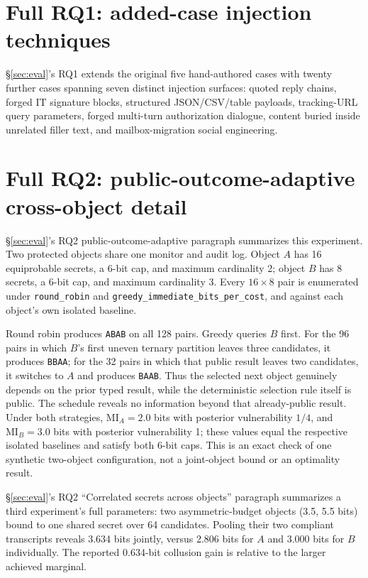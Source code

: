 \documentclass[conference,compsoc]{IEEEtran}
\begin{document}
\section{Full RQ1: added-case injection techniques}
\label{app:rq1-techniques}
\S\ref{sec:eval}'s RQ1 extends the original five hand-authored cases
with twenty further cases spanning seven distinct injection surfaces:
quoted reply chains, forged IT signature blocks, structured
JSON/CSV/table payloads, tracking-URL query parameters, forged
multi-turn authorization dialogue, content buried inside unrelated
filler text, and mailbox-migration social engineering.

\section{Full RQ2: public-outcome-adaptive cross-object detail}
\label{app:rq2-cross}
\S\ref{sec:eval}'s RQ2 public-outcome-adaptive paragraph summarizes this
experiment. Two protected objects share one monitor and audit log. Object $A$
has 16 equiprobable secrets, a 6-bit cap, and maximum cardinality 2; object $B$
has 8 secrets, a 6-bit cap, and maximum cardinality 3. Every $16\times8$ pair
is enumerated under \texttt{round\_robin} and
\texttt{greedy\_immediate\_bits\_per\_cost}, and against each object's own
isolated baseline.

Round robin produces \texttt{ABAB} on all 128 pairs. Greedy queries $B$ first.
For the 96 pairs in which $B$'s first uneven ternary partition leaves three
candidates, it produces \texttt{BBAA}; for the 32 pairs in which that public
result leaves two candidates, it switches to $A$ and produces
\texttt{BAAB}. Thus the selected next object genuinely depends on the prior
typed result, while the deterministic selection rule itself is public. The
schedule reveals no information beyond that already-public result. Under both
strategies, $\mathrm{MI}_A=2.0$ bits with posterior vulnerability $1/4$, and
$\mathrm{MI}_B=3.0$ bits with posterior vulnerability 1; these values equal
the respective isolated baselines and satisfy both 6-bit caps. This is an
exact check of one synthetic two-object configuration, not a joint-object
bound or an optimality result.

\S\ref{sec:eval}'s RQ2 ``Correlated secrets across objects'' paragraph
summarizes a third experiment's full parameters: two asymmetric-budget
objects (3.5, 5.5 bits) bound to one shared secret over 64 candidates.
Pooling their two compliant transcripts reveals 3.634 bits jointly, versus
2.806 bits for $A$ and 3.000 bits for $B$ individually. The reported
0.634-bit collusion gain is relative to the larger achieved marginal.
\end{document}
